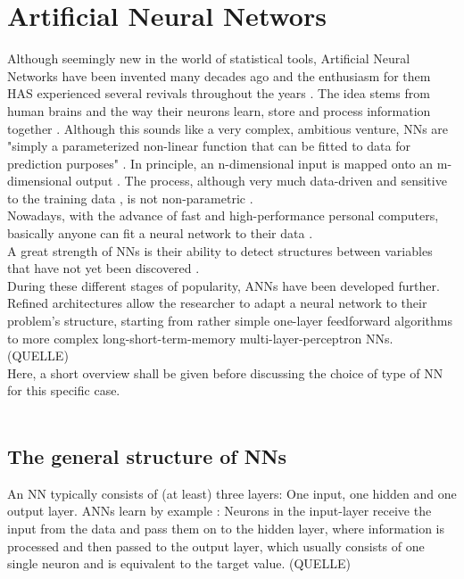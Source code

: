 \documentclass[a4paper, 11pt]{article}
\begin{document}
\section{Artificial Neural Networs}


Although seemingly new in the world of statistical tools, Artificial Neural Networks have been invented many decades ago and the enthusiasm for them HAS experienced several revivals throughout the years \citep{Gao.2011}. The idea stems from human brains \citep{Zhang.1998} and the way their neurons learn, store and process information together \citep{Balkin.1997}. Although this sounds like a very complex, ambitious venture, NNs are "simply a parameterized non-linear function that can be fitted to data for prediction purposes" \citep{Nakamura.2005}. In principle, an n-dimensional input is mapped onto an m-dimensional output \citep{Rojas.1996}. The process, although very much data-driven \citep{Zhang.1998} and sensitive to the training data \citep{Adhikari.2015}, is not non-parametric \citep{Dorffner96neuralnetworks}. \\
 Nowadays, with the advance of fast and high-performance personal computers, basically anyone can fit a neural network to their data \citep{Gao.2011}.\\
A great strength of NNs is their ability to detect structures between variables that have not yet been discovered \citep{Zhang.1998}.\\ 
During these different stages of popularity, ANNs have been developed further. Refined architectures allow the researcher to adapt a neural network to their problem's structure, starting from rather simple one-layer feedforward algorithms to more complex long-short-term-memory multi-layer-perceptron NNs. (QUELLE)\\
Here, a short overview shall be given before discussing the choice of type of NN for this specific case.\\
\\
\subsection{The general structure of NNs}

An NN typically consists of (at least) three layers: One input, one hidden and one output layer. ANNs learn by example \citep{Balkin.1997, Gao.2011}: Neurons in the input-layer receive the input from the data and pass them on to the hidden layer, where information is processed and then passed to the output layer, which usually consists of one single neuron and is equivalent to the target value. (QUELLE)\\
\end{document}
